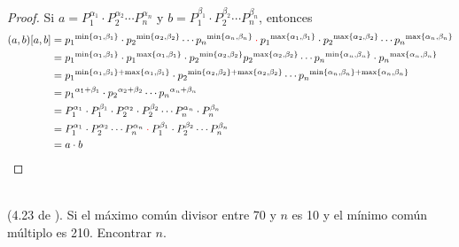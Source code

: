 \begin{proof}
	Si $a=P_1^{\alpha_1}\cdot P_2^{\alpha_2}\cdots P_n^{\alpha_n} $ y $b=P_1^{\beta_1}\cdot P_2^{\beta_2}\cdots P_n^{\beta_n} $, entonces 
	\begin{align*}
	(a,b)[a,b] 		&= {p_1}^{\min\{\alpha_1,\beta_1\}} \cdot {p_2}^{\min\{\alpha_2,\beta_2\}} \cdots {p_n}^{\min\{\alpha_n,\beta_n\}} \color{red}\cdot \color{black} {p_1}^{\max\{\alpha_1,\beta_1\}} \cdot {p_2}^{\max\{\alpha_2,\beta_2\}} \cdots {p_n}^{\max\{\alpha_n,\beta_n\}} \\
	&= {p_1}^{\min\{\alpha_1,\beta_1\}} \cdot {p_1}^{\max\{\alpha_1,\beta_1\}} \cdot {p_2}^{\min\{\alpha_2,\beta_2\}} {p_2}^{\max\{\alpha_2,\beta_2\}} \cdots {p_n}^{\min\{\alpha_n,\beta_n\}} \cdot {p_n}^{\max\{\alpha_n,\beta_n\}}\\
	&= {p_1}^{\min\{\alpha_1,\beta_1\} +  \max\{\alpha_1,\beta_1\} }\cdot {p_2}^{\min\{\alpha_2,\beta_2\} + \max\{\alpha_2,\beta_2\}}  \cdots {p_n}^{\min\{\alpha_n,\beta_n\} + \max\{\alpha_n,\beta_n\}} \\
	&= {p_1}^{\alpha_1 + \beta_1} \cdot {p_2}^{\alpha_2 + \beta_2} \cdots {p_n}^{\alpha_n+ \beta_n} \\
	&= P_1^{\alpha_1}\cdot P_1^{\beta_1} \cdot P_2^{\alpha_2}\cdot P_2^{\beta_2}\cdots P_n^{\alpha_n} \cdot P_n^{\beta_n}\\
	&= P_1^{\alpha_1}\cdot P_2^{\alpha_2}\cdots P_n^{\alpha_n} \color{red}\cdot \color{black}  P_1^{\beta_1}\cdot P_2^{\beta_2}\cdots P_n^{\beta_n}\\
	&= a\cdot b
	\end{align*}
\end{proof}












\begin{exer}{\ \\}
	(4.23 de \cite{Aops_TN}). Si el máximo común divisor entre 70 y $n$ es 10 y el mínimo común múltiplo es 210. Encontrar $n$.
\end{exer}

